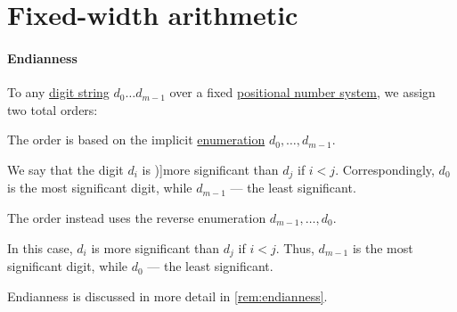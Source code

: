 \section{Fixed-width arithmetic}\label{sec:fixed_width_arithmetic}

\paragraph{Endianness}

\begin{definition}\label{def:endianness}\mimprovised
  To any \hyperref[def:positional_number_system]{digit string} \( d_0 \ldots d_{m-1} \) over a fixed \hyperref[def:positional_number_system]{positional number system}, we assign two total orders:

  \begin{thmenum}
     The  order is based on the implicit \hyperref[def:set_enumeration]{enumeration} \( d_0, \ldots, d_{m-1} \).

    We say that the digit \( d_i \) is \term[en=more significant (\cite[195]{Knuth1997ArtVol2})]{more significant} than \( d_j \) if \( i < j \). Correspondingly, \( d_0 \) is the most significant digit, while \( d_{m-1} \) --- the least significant.

     The  order instead uses the reverse enumeration \( d_{m-1}, \ldots, d_0 \).

    In this case, \( d_i \) is more significant than \( d_j \) if \( i < j \). Thus, \( d_{m-1} \) is the most significant digit, while \( d_0 \) --- the least significant.
  \end{thmenum}
\end{definition}
\begin{comments}
  \item Endianness is discussed in more detail in \cref{rem:endianness}.
\end{comments}

